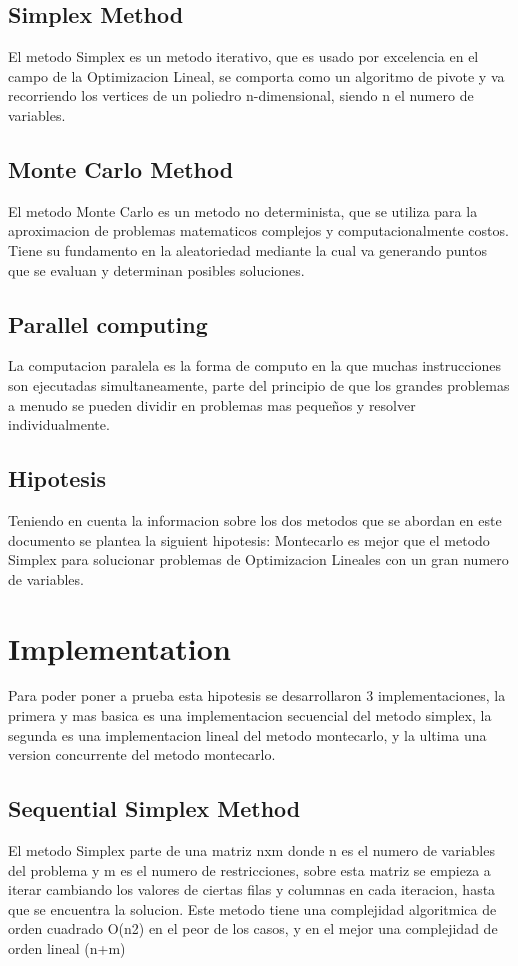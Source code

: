 \documentclass[runningheads]{llncs}
\begin{document}
\subsection{Simplex Method}
El metodo Simplex es un metodo iterativo, que es usado por excelencia en el campo de la Optimizacion Lineal, se comporta como un algoritmo de pivote y va recorriendo los vertices de un poliedro n-dimensional, siendo n el numero de variables.

\subsection{Monte Carlo Method}
El metodo Monte Carlo es un metodo no determinista, que se utiliza para la aproximacion de problemas matematicos complejos y computacionalmente costos. Tiene su fundamento en la aleatoriedad mediante la cual va generando puntos que se evaluan y determinan posibles soluciones.

\subsection{Parallel computing}
La computacion paralela es la forma de computo en la que muchas instrucciones son ejecutadas simultaneamente, parte del principio de que los grandes problemas a menudo se pueden dividir en problemas mas pequeños y resolver individualmente.

\subsection{Hipotesis}
Teniendo en cuenta la informacion sobre los dos metodos que se abordan en este documento se plantea la siguient hipotesis: 
Montecarlo es mejor que el metodo Simplex para solucionar problemas de Optimizacion Lineales con un gran numero de variables.

\section{Implementation}
Para poder poner a prueba esta hipotesis se desarrollaron 3 implementaciones, la primera y mas basica es una implementacion secuencial del metodo simplex, la segunda es una implementacion lineal del metodo montecarlo, y la ultima una version concurrente del metodo montecarlo.

\subsection{Sequential Simplex Method}
El metodo Simplex parte de una matriz nxm donde n es el numero de variables del problema y m es el numero de restricciones, sobre esta matriz se empieza a iterar cambiando los valores de ciertas filas y columnas en cada iteracion, hasta que se encuentra la solucion.
Este metodo tiene una complejidad algoritmica de orden cuadrado O(n2)­ en el peor de los casos, y en el mejor una complejidad de orden lineal (n+m)
\end{document}
